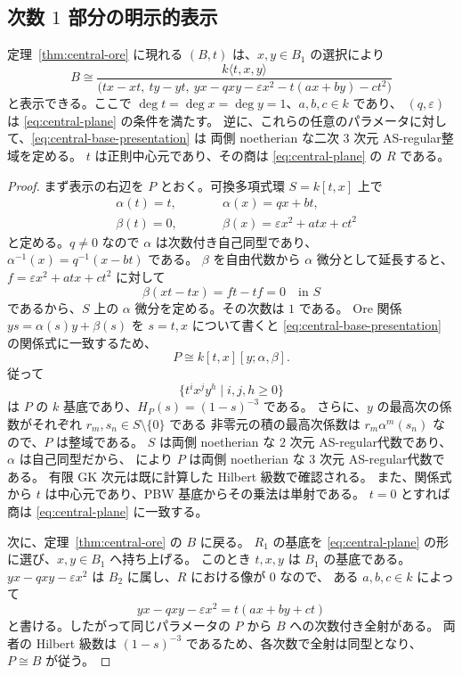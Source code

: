 \subsection{次数 \texorpdfstring{$1$}{1} 部分の明示的表示}

\begin{proposition}\label{prop:central-base-presentation}
定理~\ref{thm:central-ore} に現れる $(B,t)$ は、$x,y\in B_1$ の選択により
\begin{equation}\label{eq:central-base-presentation}
 B\cong
 \frac{k\langle t,x,y\rangle}
 {\bigl(tx-xt,\ ty-yt,\ yx-qxy-\varepsilon x^2-t(ax+by)-ct^2\bigr)}
\end{equation}
と表示できる。ここで $\deg t=\deg x=\deg y=1$、$a,b,c\in k$ であり、
$(q,\varepsilon)$ は \eqref{eq:central-plane} の条件を満たす。
逆に、これらの任意のパラメータに対して、\eqref{eq:central-base-presentation} は
両側 noetherian な二次 $3$ 次元 AS-regular整域を定める。
$t$ は正則中心元であり、その商は \eqref{eq:central-plane} の $R$ である。
\end{proposition}

\begin{proof}
まず表示の右辺を $P$ とおく。可換多項式環 $S=k[t,x]$ 上で
\begin{align*}
  &\alpha(t)=t,\qquad &&\alpha(x)=qx+bt,\\
  &\beta(t)=0,\qquad &&\beta(x)=\varepsilon x^2+atx+ct^2
\end{align*}
と定める。$q\ne0$ なので $\alpha$ は次数付き自己同型であり、
$\alpha^{-1}(x)=q^{-1}(x-bt)$ である。
$\beta$ を自由代数から $\alpha$ 微分として延長すると、
$f=\varepsilon x^2+atx+ct^2$ に対して
\[
  \beta(xt-tx)=ft-tf=0\quad\text{in }S
\]
であるから、$S$ 上の $\alpha$ 微分を定める。その次数は $1$ である。
Ore 関係 $ys=\alpha(s)y+\beta(s)$ を $s=t,x$ について書くと
\eqref{eq:central-base-presentation} の関係式に一致するため、
\begin{equation}\label{eq:central-base-iterated-ore}
 P\cong k[t,x][y;\alpha,\beta].
\end{equation}
従って
\[
   \{t^i x^j y^h\mid i,j,h\ge0\}
\]
は $P$ の $k$ 基底であり、$H_P(s)=(1-s)^{-3}$ である。
さらに、$y$ の最高次の係数がそれぞれ $r_m,s_n\in S\setminus\{0\}$ である
非零元の積の最高次係数は $r_m\alpha^m(s_n)$ なので、$P$ は整域である。
$S$ は両側 noetherian な $2$ 次元 AS-regular代数であり、$\alpha$ は自己同型だから、
\cite[Sections~1.2--1.3 and Theorem~3.3]{LWW} により
$P$ は両側 noetherian な $3$ 次元 AS-regular代数である。
有限 GK 次元は既に計算した Hilbert 級数で確認される。
また、関係式から $t$ は中心元であり、PBW 基底からその乗法は単射である。
$t=0$ とすれば商は \eqref{eq:central-plane} に一致する。

次に、定理~\ref{thm:central-ore} の $B$ に戻る。
$R_1$ の基底を \eqref{eq:central-plane} の形に選び、$x,y\in B_1$ へ持ち上げる。
このとき $t,x,y$ は $B_1$ の基底である。
$yx-qxy-\varepsilon x^2$ は $B_2$ に属し、$R$ における像が $0$ なので、
ある $a,b,c\in k$ によって
\[
  yx-qxy-\varepsilon x^2=t(ax+by+ct)
\]
と書ける。したがって同じパラメータの $P$ から $B$ への次数付き全射がある。
両者の Hilbert 級数は $(1-s)^{-3}$ であるため、各次数で全射は同型となり、
$P\cong B$ が従う。
\end{proof}

